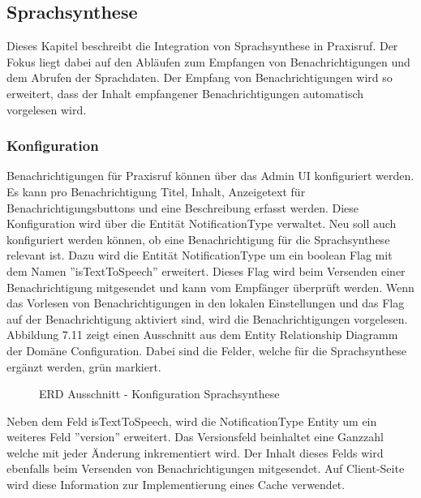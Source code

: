 \subsection{Sprachsynthese}

Dieses Kapitel beschreibt die Integration von Sprachsynthese in Praxisruf.
Der Fokus liegt dabei auf den Abläufen zum Empfangen von Benachrichtigungen und dem Abrufen der Sprachdaten.
Der Empfang von Benachrichtigungen wird so erweitert, dass der Inhalt empfangener Benachrichtigungen automatisch vorgelesen wird.

\subsubsection{Konfiguration}

Benachrichtigungen für Praxisruf können über das Admin UI konfiguriert werden.
Es kann pro Benachrichtigung Titel, Inhalt, Anzeigetext für Benachrichtigungsbuttons und eine Beschreibung erfasst werden.
Diese Konfiguration wird über die Entität NotificationType verwaltet.
Neu soll auch konfiguriert werden können, ob eine Benachrichtigung für die Sprachsynthese relevant ist.
Dazu wird die Entität NotificationType um ein boolean Flag mit dem Namen ''isTextToSpeech'' erweitert.
Dieses Flag wird beim Versenden einer Benachrichtigung mitgesendet und kann vom Empfänger überprüft werden.
Wenn das Vorlesen von Benachrichtigungen in den lokalen Einstellungen und das Flag auf der Benachrichtigung aktiviert sind, wird die Benachrichtigungen vorgelesen.
Abbildung 7.11 zeigt einen Ausschnitt aus dem Entity Relationship Diagramm der Domäne Configuration.
Dabei sind die Felder, welche für die Sprachsynthese ergänzt werden, grün markiert.

\begin{figure}[h]
    \centering
    \begin{minipage}[b]{0.6\textwidth}
        \caption{ERD Ausschnitt - Konfiguration Sprachsynthese}
    \end{minipage}
\end{figure}

Neben dem Feld isTextToSpeech, wird die NotificationType Entity um ein weiteres Feld ''version'' erweitert.
Das Versionsfeld beinhaltet eine Ganzzahl welche mit jeder Änderung inkrementiert wird.
Der Inhalt dieses Felds wird ebenfalls beim Versenden von Benachrichtigungen mitgesendet.
Auf Client-Seite wird diese Information zur Implementierung eines Cache verwendet.

